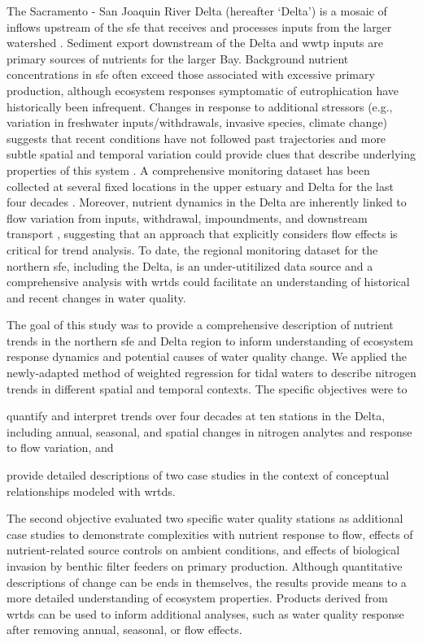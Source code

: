 \documentclass[journal = esthag, manuscript = article]{achemso}\usepackage[]{graphicx}\usepackage[]{color}
\begin{document}
The Sacramento - San Joaquin River Delta (hereafter `Delta') is a mosaic of inflows upstream of the \ac{sfe} that receives and processes inputs from the larger watershed \cite{Jassby00,Jassby02,Jassby08}. Sediment export downstream of the Delta and \ac{wwtp} inputs are primary sources of nutrients for the larger Bay.  Background nutrient concentrations in \ac{sfe} often exceed those associated with excessive primary production, although ecosystem responses symptomatic of eutrophication have historically been infrequent.  Changes in response to additional stressors (e.g., variation in freshwater inputs/withdrawals, invasive species, climate change) suggests that recent conditions have not followed past trajectories and more subtle spatial and temporal variation could provide clues that describe underlying properties of this system \cite{Cloern12b}.  A comprehensive monitoring dataset has been collected at several fixed locations in the upper estuary and Delta for the last four decades \cite{Jabusch16}.  Moreover, nutrient dynamics in the Delta are inherently linked to flow variation from inputs, withdrawal, impoundments, and downstream transport \cite{Novick15}, suggesting that an approach that explicitly considers flow effects is critical for trend analysis.  To date, the regional monitoring dataset for the northern \ac{sfe}, including the Delta, is an under-utitilized data source and a comprehensive analysis with \ac{wrtds} could facilitate an understanding of historical and recent changes in water quality.

The goal of this study was to provide a comprehensive description of nutrient trends in the northern \ac{sfe} and Delta region to inform understanding of ecosystem response dynamics and potential causes of water quality change. We applied the newly-adapted method of weighted regression for tidal waters to describe nitrogen trends in  different spatial and temporal contexts. The specific objectives were to \begin{inparaenum}[1\upshape)]  
\item quantify and interpret trends over four decades at ten stations in the Delta, including annual, seasonal, and spatial changes in nitrogen analytes and response to flow variation, and
\item provide detailed descriptions of two case studies in the context of conceptual relationships modeled with \ac{wrtds}.
\end{inparaenum}
The second objective evaluated two specific water quality stations as additional case studies to demonstrate complexities with nutrient response to flow, effects of nutrient-related source controls on ambient conditions, and effects of biological invasion by benthic filter feeders on primary production. Although quantitative descriptions of change can be ends in themselves, the results provide means to a more detailed understanding of ecosystem properties.  Products derived from \ac{wrtds} can be used to inform additional analyses, such as water quality response after removing annual, seasonal, or flow effects.
\end{document}
